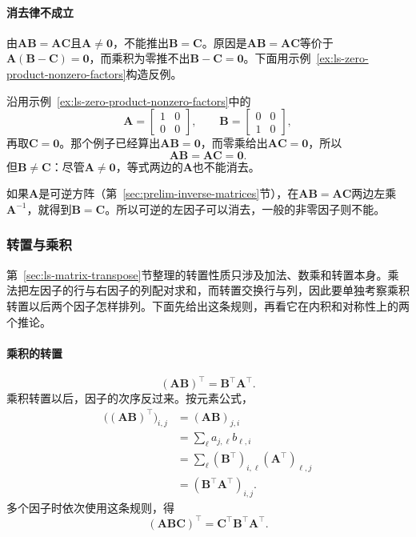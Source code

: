 \paragraph{消去律不成立}
由$\bm A\bm B=\bm A\bm C$且$\bm A\neq\bm0$，不能推出$\bm B=\bm C$。原因是$\bm A\bm B=\bm A\bm C$等价于$\bm A(\bm B-\bm C)=\bm0$，而乘积为零推不出$\bm B-\bm C=\bm0$。下面用示例~\ref{ex:ls-zero-product-nonzero-factors}构造反例。
\begin{example}[反例：非零的左因子不能消去]
\label{ex:ls-cancellation-fails}
沿用示例~\ref{ex:ls-zero-product-nonzero-factors}中的
\[
\bm A=\begin{bmatrix}1&0\\0&0\end{bmatrix},\qquad
\bm B=\begin{bmatrix}0&0\\1&0\end{bmatrix},
\]
再取$\bm C=\bm0$。那个例子已经算出$\bm A\bm B=\bm0$，而零乘给出$\bm A\bm C=\bm0$，所以
\[
 \bm A\bm B=\bm A\bm C=\bm0.
\]
但$\bm B\neq\bm C$：尽管$\bm A\neq\bm0$，等式两边的$\bm A$也不能消去。
\end{example}
如果$\bm A$是可逆方阵（第~\ref{sec:prelim-inverse-matrices}节），在$\bm A\bm B=\bm A\bm C$两边左乘$\bm A^{-1}$，就得到$\bm B=\bm C$。所以可逆的左因子可以消去，一般的非零因子则不能。

\subsubsection{转置与乘积}
\label{sec:ls-reshaping}

第~\ref{sec:ls-matrix-transpose}节整理的转置性质只涉及加法、数乘和转置本身。乘法把左因子的行与右因子的列配对求和，而转置交换行与列，因此要单独考察乘积转置以后两个因子怎样排列。下面先给出这条规则，再看它在内积和对称性上的两个推论。

\paragraph{乘积的转置}
\begin{equation}
 (\bm A\bm B)^\top=\bm B^\top\bm A^\top.
 \label{eq:ls-transpose-product}
\end{equation}
乘积转置以后，因子的次序反过来。按元素公式，
\[
 \begin{aligned}
 \bigl((\bm A\bm B)^\top\bigr)_{i,j}
 &=(\bm A\bm B)_{j,i}\\
 &=\sum_\ell a_{j,\ell}b_{\ell,i}\\
 &=\sum_\ell(\bm B^\top)_{i,\ell}(\bm A^\top)_{\ell,j}\\
 &=(\bm B^\top\bm A^\top)_{i,j}.
 \end{aligned}
\]
多个因子时依次使用这条规则，得
\[
 (\bm A\bm B\bm C)^\top=\bm C^\top\bm B^\top\bm A^\top.
\]

